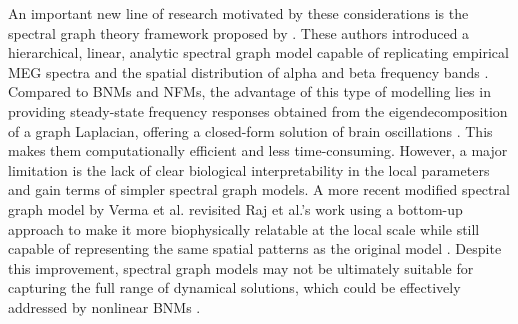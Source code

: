 \documentclass[12pt,twoside]{article}
\begin{document}
An important new line of research motivated by these considerations is the spectral graph theory framework proposed by \citet{raj2020spectral}. These authors introduced a hierarchical, linear, analytic spectral graph model capable of replicating empirical MEG spectra and the spatial distribution of alpha and beta frequency bands \citep{raj2020spectral}. Compared to BNMs and NFMs, the advantage of this type of modelling lies in providing steady-state frequency responses obtained from the eigendecomposition of a graph Laplacian, offering a closed-form solution of brain oscillations \citep{verma2022spectral}. This makes them computationally efficient and less time-consuming. However, a major limitation is the lack of clear biological interpretability in the local parameters and gain terms of simpler spectral graph models. A more recent modified spectral graph model by Verma et al. revisited Raj et al.'s work using a bottom-up approach to make it more biophysically relatable at the local scale while still capable of representing the same spatial patterns as the original model \citep{verma2022spectral}. Despite this improvement, spectral graph models may not be ultimately suitable for capturing the full range of dynamical solutions, which could be effectively addressed by nonlinear BNMs \citep{verma2022spectral}. 





\end{document}
